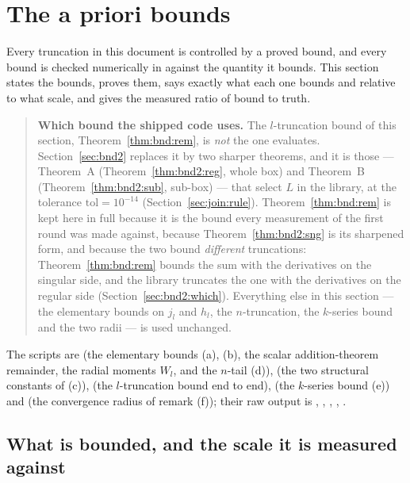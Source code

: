 \section{The a priori bounds}
\label{sec:bnd}

Every truncation in this document is controlled by a proved bound, and every bound is
checked numerically in  against the quantity it bounds. This section states
the bounds, proves them, says exactly what each one bounds and relative to what scale, and
gives the measured ratio of bound to truth.

\begin{quote}
\textbf{Which bound the shipped code uses.} The $l$-truncation bound of this section,
Theorem~\ref{thm:bnd:rem}, is \emph{not} the one  evaluates.
Section~\ref{sec:bnd2} replaces it by two sharper theorems, and it is those --- Theorem~A
(Theorem~\ref{thm:bnd2:reg}, whole box) and Theorem~B (Theorem~\ref{thm:bnd2:sub},
sub-box) --- that select
$L$ in the library, at the tolerance $\mathrm{tol} = 10^{-14}$
(Section~\ref{sec:join:rule}). Theorem~\ref{thm:bnd:rem} is kept here in full because it is
the bound every measurement of the first round was made against, because
Theorem~\ref{thm:bnd2:sng} is its sharpened form, and because the two bound
\emph{different} truncations: Theorem~\ref{thm:bnd:rem} bounds the sum with the derivatives
on the singular side, and the library truncates the one with the derivatives on the regular
side (Section~\ref{sec:bnd2:which}). Everything else in this section --- the elementary
bounds on $j_l$ and $h_l$, the $n$-truncation, the $k$-series bound and the two radii ---
is used unchanged.
\end{quote}

\noindent
The scripts are
 (the elementary bounds (a), (b), the scalar addition-theorem
remainder, the radial moments $W_l$, and the $n$-tail (d)),  (the two
structural constants of (c)),  (the $l$-truncation bound end to end),
 (the $k$-series bound (e)) and  (the convergence radius
of remark (f)); their raw output is , ,
, , .

\subsection{What is bounded, and the scale it is measured against}
\label{sec:bnd:scale}

